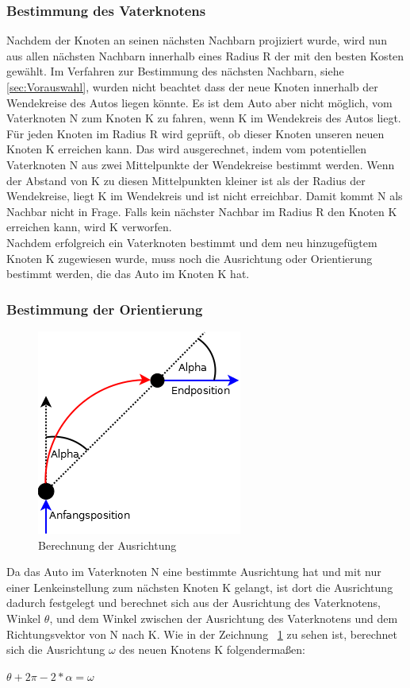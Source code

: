 \subsubsection{Bestimmung des Vaterknotens}
Nachdem der Knoten an seinen nächsten Nachbarn projiziert wurde, wird nun aus allen nächsten Nachbarn innerhalb eines Radius R der mit den besten Kosten gewählt. Im Verfahren zur Bestimmung des nächsten Nachbarn, siehe \ref{sec:Vorauswahl}, wurden nicht beachtet dass der neue Knoten innerhalb der Wendekreise des Autos liegen könnte. Es ist dem Auto aber nicht möglich, vom Vaterknoten N zum Knoten K zu fahren, wenn K im Wendekreis des Autos liegt. \\
Für jeden Knoten im Radius R wird geprüft, ob dieser Knoten unseren neuen Knoten K erreichen kann. Das wird ausgerechnet, indem vom potentiellen Vaterknoten N aus zwei Mittelpunkte der Wendekreise bestimmt werden. Wenn der Abstand von K zu diesen Mittelpunkten kleiner ist als der Radius der Wendekreise, liegt K im Wendekreis und ist nicht erreichbar. Damit kommt N als Nachbar nicht in Frage. Falls kein nächster Nachbar im Radius R den Knoten K erreichen kann, wird K verworfen. \\
Nachdem erfolgreich ein Vaterknoten bestimmt und dem neu hinzugefügtem Knoten K zugewiesen wurde, muss noch die Ausrichtung oder Orientierung bestimmt werden, die das Auto im Knoten K hat.
\subsubsection{Bestimmung der Orientierung}

\begin{figure}
\label{fig:fig8}
\centering
\includegraphics[scale=1]{Bilder/BerechnungOrientierung.png} 
\caption{Berechnung der Ausrichtung}
\end{figure}
Da das Auto im Vaterknoten N eine bestimmte Ausrichtung hat und mit nur einer Lenkeinstellung zum nächsten Knoten K gelangt, ist dort die Ausrichtung dadurch festgelegt und berechnet sich aus der Ausrichtung des Vaterknotens, Winkel $\theta$, und dem Winkel zwischen der Ausrichtung des Vaterknotens und dem Richtungsvektor von N nach K. Wie in der Zeichnung ~\ref{fig:fig8} zu sehen ist, berechnet sich die Ausrichtung $\omega$ des neuen Knotens K folgendermaßen:
\begin{center}
	$\theta + 2 \pi - 2*\alpha = \omega$
\end{center}
